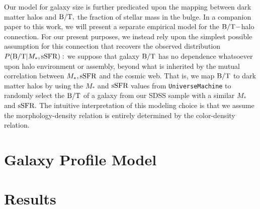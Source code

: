 \documentclass[usenatbib,usegraphicx,letterpaper]{mn2e}
\newcommand{\bt}{{\rm B/T}}
\newcommand{\mstar}{M_{\ast}}
\newcommand{\ssfr}{{\rm sSFR}}
\begin{document}
Our model for galaxy size is further predicated upon the mapping between dark matter halos and $\bt,$ the fraction of stellar mass in the bulge. In a companion paper to this work, we will present a separate empirical model for the $\bt-$halo connection. For our present purposes, we instead rely upon the simplest possible assumption for this connection that recovers the observed distribution $P(\bt\vert\mstar,\ssfr):$ we suppose that galaxy $\bt$ has no dependence whatsoever upon halo environment or assembly, beyond what is inherited by the mutual correlation between $\mstar, \ssfr$ and the cosmic web. That is, we map $\bt$ to dark matter halos by using the $\mstar$ and $\ssfr$ values from {\tt UniverseMachine} to randomly select the $\bt$ of a galaxy from our SDSS sample with a similar $\mstar$ and $\ssfr.$ The intuitive interpretation of this modeling choice is that we assume the morphology-density relation is entirely determined by the color-density relation. 

\section{Galaxy Profile Model}
\label{sec:model}

\section{Results}
\label{sec:results}
\end{document}
